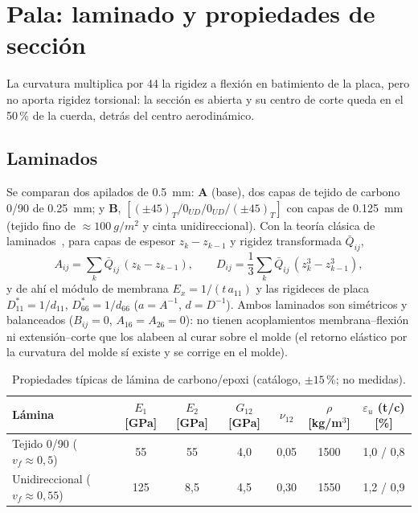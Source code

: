 \section{Pala: laminado y propiedades de sección}\label{sec:estructura-pala}

La curvatura multiplica por 44 la rigidez a flexión en batimiento de la placa, pero no
aporta rigidez torsional: la sección es abierta y su centro de corte queda en el 50\,\% de
la cuerda, detrás del centro aerodinámico.

\subsection{Laminados}
Se comparan dos apilados de \SI{0.5}{mm}: \textbf{A} (base), dos capas de tejido de
carbono 0/90 de \SI{0.25}{mm}; y \textbf{B}, $[(\pm45)_T/0_{UD}/0_{UD}/(\pm45)_T]$ con
capas de \SI{0.125}{mm} (tejido fino de $\approx\SI{100}{g/m^2}$ y cinta unidireccional).
Con la teoría clásica de laminados~\cite{estructura-jones1999}, para capas de espesor
$z_k-z_{k-1}$ y rigidez transformada $\bar Q_{ij}$,
\begin{equation}
  A_{ij}=\sum_k \bar Q_{ij}\,(z_k-z_{k-1}),\qquad
  D_{ij}=\frac13\sum_k \bar Q_{ij}\,(z_k^3-z_{k-1}^3),
  \label{eq:estructura-clt}
\end{equation}
y de ahí el módulo de membrana $E_x=1/(t\,a_{11})$ y las rigideces de placa
$D_{11}^*=1/d_{11}$, $D_{66}^*=1/d_{66}$ ($a=A^{-1}$, $d=D^{-1}$). Ambos laminados son
simétricos y balanceados ($B_{ij}=0$, $A_{16}=A_{26}=0$): no tienen acoplamientos
membrana--flexión ni extensión--corte que los alabeen al curar sobre el molde (el
retorno elástico por la curvatura del molde sí existe y se corrige en el molde).

\begin{table}[H]
\centering\small
\caption{Propiedades típicas de lámina de carbono/epoxi (catálogo, $\pm15$\,\%; no
medidas).}\label{tab:estructura-lamina}
\begin{tabular}{@{}lcccccc@{}}
\toprule
\textbf{Lámina} & $E_1$ [GPa] & $E_2$ [GPa] & $G_{12}$ [GPa] & $\nu_{12}$ & $\rho$ [kg/m$^3$] & $\varepsilon_u$ (t/c) [\%]\\\midrule
Tejido 0/90 ($v_f\approx0{,}5$) & 55 & 55 & 4,0 & 0,05 & 1500 & 1,0 / 0,8\\
Unidireccional ($v_f\approx0{,}55$) & 125 & 8,5 & 4,5 & 0,30 & 1550 & 1,2 / 0,9\\
\bottomrule
\end{tabular}
\end{table}


